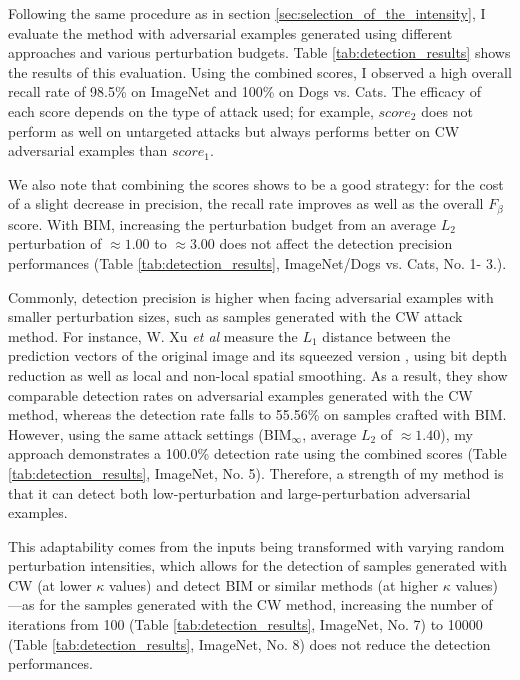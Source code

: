 Following the same procedure as in section \ref{sec:selection_of_the_intensity},
I evaluate the method with adversarial examples generated using different
approaches and various perturbation budgets. Table \ref{tab:detection_results}
shows the results of this evaluation. Using the combined scores, I observed a
high overall recall rate of 98.5\% on ImageNet and 100\% on Dogs vs. Cats. The
efficacy of each score depends on the type of attack used; for example,
$score_2$ does not perform as well on untargeted attacks but always performs
better on CW adversarial examples than $score_1$.

We also note that combining the scores shows to be a good strategy: for the cost
of a slight decrease in precision, the recall rate improves as well as the
overall $F_{\beta}$ score. With BIM, increasing the perturbation budget from an
average $L_2$ perturbation of $\approx 1.00$ to $\approx 3.00$ does not affect
the detection precision performances (Table \ref{tab:detection_results},
ImageNet/Dogs vs. Cats, No. 1- 3.).

Commonly, detection precision is higher when facing adversarial examples with
smaller perturbation sizes, such as samples generated with the CW attack method.
For instance, W. Xu \emph{et al} measure the $L_1$ distance between the
prediction vectors of the original image and its squeezed version
\cite{xu_feature_2018}, using bit depth reduction as well as local and non-local
spatial smoothing. As a result, they show comparable detection rates on
adversarial examples generated with the CW method, whereas the detection rate
falls to 55.56\% on samples crafted with BIM. However, using the same attack
settings (BIM$_\infty$, average $L_2$ of $\approx 1.40$), my approach
demonstrates a 100.0\% detection rate using the combined scores (Table
\ref{tab:detection_results}, ImageNet, No. 5). Therefore, a strength of my
method is that it can detect both low-perturbation and large-perturbation
adversarial examples.

This adaptability comes from the inputs being transformed with varying random
perturbation intensities, which allows for the detection of samples generated
with CW (at lower $\kappa$ values) and detect BIM or similar methods (at
higher $\kappa$ values)—as for the samples generated with the CW method,
increasing the number of iterations from 100 (Table \ref{tab:detection_results},
ImageNet, No. 7) to 10000 (Table \ref{tab:detection_results}, ImageNet, No. 8)
does not reduce the detection performances.

